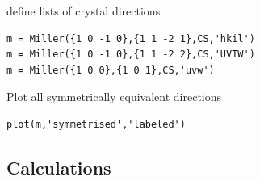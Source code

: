 \documentclass[compress]{beamer}
\begin{document}
\begin{frame}[fragile]
  define lists of crystal directions
  \vspace{-.2cm}
  \begin{lstlisting}[style=input]
m = Miller({1 0 -1 0},{1 1 -2 1},CS,'hkil')
m = Miller({1 0 -1 0},{1 1 -2 2},CS,'UVTW')
m = Miller({1 0 0},{1 0 1},CS,'uvw')
  \end{lstlisting}%

  \medskip

  Plot all symmetrically equivalent directions
    \vspace{-.2cm}
  \begin{lstlisting}[style=input]
plot(m,'symmetrised','labeled')
  \end{lstlisting}



\end{frame}

\subsection*{Calculations}
\end{document}
